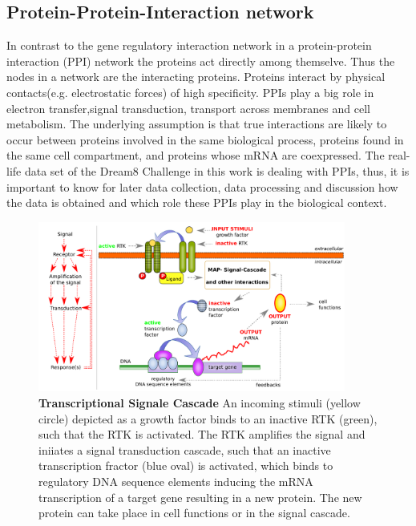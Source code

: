 \subsection*{Protein-Protein-Interaction network}
In contrast to the gene regulatory interaction network in a protein-protein interaction (\gls{PPI}) network the proteins act directly among themselve. Thus the nodes in a network are the interacting proteins. Proteins interact by physical contacts(e.g. electrostatic forces) of high specificity. PPIs play a big role in electron transfer,signal transduction, transport across membranes and cell metabolism. The underlying assumption is that true interactions are likely to occur between proteins involved in the same biological process, proteins found in the same cell compartment, and proteins whose mRNA are coexpressed.
The real-life data set of the Dream8 Challenge in this work is dealing with PPIs, thus, it is important to know for later data collection, data processing and discussion how the data is obtained and which role these PPIs play in the biological context.


\begin{figure}[H]
\captionsetup{width=.9\linewidth}
\centering
\includegraphics[width=0.9\textwidth]{./Bilder/GRNDREAM8.pdf}
\caption[Transcriptional Signale Cascade of RTKs]{\textbf{Transcriptional Signale Cascade} An incoming stimuli (yellow circle) depicted as a growth factor binds to an inactive RTK (green), such that the RTK is activated. The RTK amplifies the signal and iniiates a signal transduction cascade, such that an inactive transcription fractor (blue oval) is activated, which binds to regulatory DNA sequence elements inducing the mRNA transcription of a target gene resulting in a new protein. The new protein can take place in cell functions or in the signal cascade. \citep{https://public.ornl.gov/site/gallery/detail.cfm?id=302&topic=&citation=&general=gene20regulatory20network&restsection=all} }
\label{fig:DREAM8GRN}
\end{figure}

